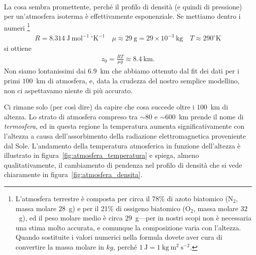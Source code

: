 \begin{solution}
\begin{align}
\end{align}
La cosa sembra promettente, perché il profilo di densità (e quindi di pressione)
per un'atmosfera isoterma è effettivamente esponenziale. Se mettiamo dentro
i numeri%
\footnote{L'atmosfera terrestre è composta per circa il 78\% di azoto biatomico
(N$_2$, massa molare $28$~g) e per il 21\% di ossigeno biatomico (O$_2$, massa
molare $32$~g), ed il peso molare medio è circa $29$~g---per in nostri scopi
non è necessaria una stima molto accurata, e comunque la composizione varia con
l'altezza. Quando sostituite i valori numerici nella formula dovete aver cura di
convertire la massa molare in $kg$, perché
$1~\text{J} = 1~\text{kg}~\text{m}^2~\text{s}^{-2}$.}
\begin{align*}
  R = 8.314~\text{J}~\text{mol}^{-1}~^\circ\text{K}^{-1} \quad
  \mu \approx 29~\text{g} = 29 \times 10^{-3}~\text{kg} \quad
  T \approx 290^\circ\text{K}
\end{align*}
si ottiene
\begin{align*}
  z_0 = \frac{R T}{\mu g} \approx 8.4~\text{km}.
\end{align*}
Non siamo lontanissimi dai $6.9$~km che abbiamo ottenuto dal fit dei dati per
i primi $100$~km di atmosfera, e, data la crudezza del nostro semplice modellino,
non ci aspettavamo niente di più accurato.


Ci rimane solo (per così dire) da capire che cosa succede oltre i $100$~km di altezza.
Lo strato di atmosfera compreso tra $\sim 80$ e $\sim 600$~km prende il nome di
\emph{termosfera}, ed in questa regione la temperatura aumenta significativamente
con l'altezza a causa dell'assorbimento della radiazione elettromagnetica
proveniente dal Sole. L'andamento della temperatura atmosferica in funzione
dell'altezza è illustrato in figura~\ref{fig:atmosfera_temperatura} e spiega,
almeno qualitativamente, il cambiamento di pendenza nel profilo di densità che
si vede chiaramente in figura~\ref{fig:atmosfera_densita}.

\end{solution}



